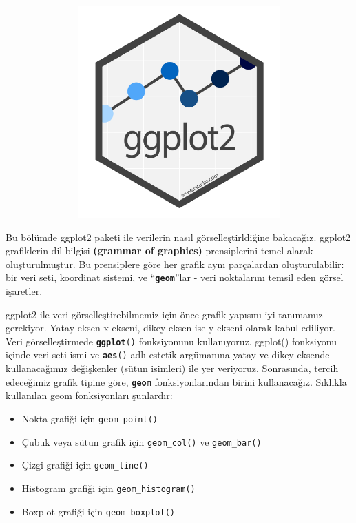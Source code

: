 \documentclass[
  letterpaper,
  DIV=11,
  numbers=noendperiod]{scrreprt}
\begin{document}
\begin{figure}

{\centering \includegraphics[width=4.4375in,height=3.20833in]{images/ggplot2.png}

}

\end{figure}

Bu bölümde ggplot2 paketi ile verilerin nasıl görselleştirldiğine
bakacağız. ggplot2 grafiklerin dil bilgisi \textbf{(grammar of
graphics)} prensiplerini temel alarak oluşturulmuştur. Bu prensiplere
göre her grafik aynı parçalardan oluşturulabilir: bir veri seti,
koordinat sistemi, ve ``\textbf{\texttt{geom}}''lar - veri noktalarını
temsil eden görsel işaretler.

ggplot2 ile veri görselleştirebilmemiz için önce grafik yapısını iyi
tanımamız gerekiyor. Yatay eksen x ekseni, dikey eksen ise y ekseni
olarak kabul ediliyor. Veri görselleştirmede
\textbf{\texttt{ggplot}}\texttt{()} fonksiyonunu kullanıyoruz. ggplot()
fonksiyonu içinde veri seti ismi ve \textbf{\texttt{aes}}\texttt{()}
adlı estetik argümanına yatay ve dikey eksende kullanacağımız
değişkenler (sütun isimleri) ile yer veriyoruz. Sonrasında, tercih
edeceğimiz grafik tipine göre, \textbf{\texttt{geom}} fonksiyonlarından
birini kullanacağız. Sıklıkla kullanılan geom fonksiyonları şunlardır:

\begin{itemize}
\item
  Nokta grafiği için \texttt{geom\_point()}
\item
  Çubuk veya sütun grafik için \texttt{geom\_col()} ve
  \texttt{geom\_bar()}
\item
  Çizgi grafiği için \texttt{geom\_line()}
\item
  Histogram grafiği için \texttt{geom\_histogram()}
\item
  Boxplot grafiği için \texttt{geom\_boxplot()}
\end{itemize}
\end{document}

